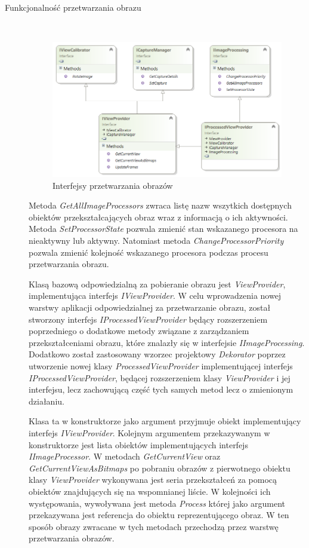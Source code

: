 \documentclass[a4paper,11pt,twoside]{report}
\theoremstyle{definition}
\begin{document}
\begin{description}

\item [Funkcjonalność przetwarzania obrazu] \hfill \\
\begin{figure}[h]
\centering
\includegraphics[scale=0.9]{images/IProcessedViewProvider}
\caption[Przetwarzanie diagram]{Interfejsy przetwarzania obrazów}
\end{figure}

Metoda \textit{GetAllImageProcessors} zwraca listę nazw wszytkich dostępnych obiektów przekształcających obraz wraz z informacją o ich aktywności.
Metoda \textit{SetProcessorState} pozwala zmienić stan wskazanego procesora na nieaktywny lub aktywny.
Natomiast metoda \textit{ChangeProcessorPriority} pozwala zmienić kolejność wskazanego procesora podczas procesu przetwarzania obrazu. 

Klasą bazową odpowiedzialną za pobieranie obrazu jest \textit{ViewProvider}, implementująca interfejs \textit{IViewProvider}. W celu wprowadzenia nowej warstwy aplikacji odpowiedzialnej za przetwarzanie obrazu, został stworzony interfejs \textit{IProcessedViewProvider} będący rozszerzeniem poprzedniego o dodatkowe metody związane z zarządzaniem przekształceniami obrazu, które znalazły się w interfejsie \textit{IImageProcessing}. Dodatkowo został zastosowany wzorzec projektowy \textit{Dekorator} poprzez utworzenie nowej klasy \textit{ProcessedViewProvider} implementującej interfejs \textit{IProcessedViewProvider}, będącej rozszerzeniem klasy \textit{ViewProvider} i jej interfejsu, lecz zachowującą część tych samych metod lecz o zmienionym działaniu.

Klasa ta w konstruktorze jako argument przyjmuje obiekt implementujący interfejs \textit{IViewProvider}. Kolejnym argumentem przekazywanym w konstruktorze jest lista obiektów implementujących interfejs \textit{IImageProcessor}. W metodach \textit{GetCurrentView} oraz \textit{GetCurrentViewAsBitmaps} po pobraniu obrazów z pierwotnego obiektu klasy \textit{ViewProvider} wykonywana jest seria przekształceń za pomocą obiektów znajdujących się na wspomnianej liście. W kolejności ich występowania, wywoływana jest metoda \textit{Process} której jako argument przekazywana jest referencja do obiektu reprezentującego obraz. W ten sposób obrazy zwracane w tych metodach przechodzą przez warstwę przetwarzania obrazów.


\end{description}
\end{document}
